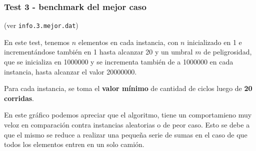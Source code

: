 \newpage
\subsubsection{Test 3 - benchmark del mejor caso}

(ver \verb|info.3.mejor.dat|) \medskip

En este test, tenemos $n$ elementos en cada instancia, con $n$ inicializado en 1 e incrementándose
también en 1 hasta alcanzar 20 y un umbral $m$ de peligrosidad, que se inicializa en 1000000 y se incrementa
también de a 1000000 en cada instancia, hasta alcanzar el valor 20000000.

Para cada instancia, se toma el \textbf{valor mínimo} de cantidad de ciclos luego de \textbf{20 corridas}.




En este gráfico podemos apreciar que el algoritmo, tiene un comportamieno
muy veloz en comparación contra instancias aleatorias o de peor caso. Esto
se debe a que el mismo se reduce a realizar una pequeña serie de sumas en el
caso de que todos los elementos entren en un solo camión.
